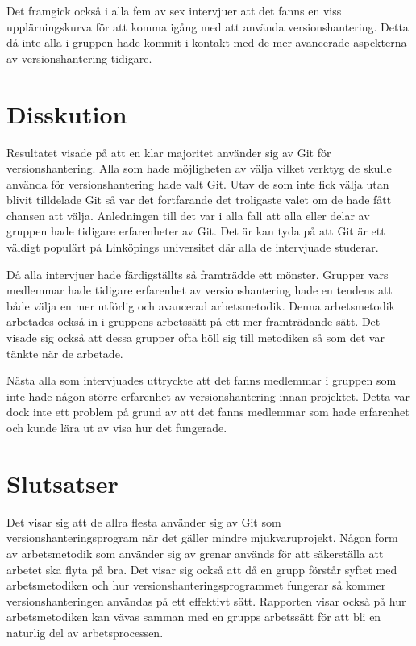 Det framgick också i alla fem av sex intervjuer att det fanns en viss upplärningskurva för att komma igång med att använda versionshantering. Detta då inte alla i gruppen hade kommit i kontakt med de mer avancerade aspekterna av versionshantering tidigare.

\section{Disskution}

Resultatet visade på att en klar majoritet använder sig av Git för versionshantering. Alla som hade möjligheten av välja vilket verktyg de skulle använda för versionshantering hade valt Git. Utav de som inte fick välja utan blivit tilldelade Git så var det fortfarande det troligaste valet om de hade fått chansen att välja. Anledningen till det var i alla fall att alla eller delar av gruppen hade tidigare erfarenheter av Git. Det är kan tyda på att Git är ett väldigt populärt på Linköpings universitet där alla de intervjuade studerar.

Då alla intervjuer hade färdigställts så framträdde ett mönster. Grupper vars medlemmar hade tidigare erfarenhet av versionshantering hade en tendens att både välja en mer utförlig och avancerad arbetsmetodik. Denna arbetsmetodik arbetades också in i gruppens arbetssätt på ett mer framträdande sätt. Det visade sig också att dessa grupper ofta höll sig till metodiken så som det var tänkte när de arbetade.

Nästa alla som intervjuades uttryckte att det fanns medlemmar i gruppen som inte hade någon större erfarenhet av versionshantering innan projektet. Detta var dock inte ett problem på grund av att det fanns medlemmar som hade erfarenhet och kunde lära ut av visa hur det fungerade.

\section{Slutsatser}

Det visar sig att de allra flesta använder sig av Git som versionshanteringsprogram när det gäller mindre mjukvaruprojekt. Någon form av arbetsmetodik som använder sig av grenar används för att säkerställa att arbetet ska flyta på bra. Det visar sig också att då en grupp förstår syftet med arbetsmetodiken och hur versionshanteringsprogrammet fungerar så kommer versionshanteringen användas på ett effektivt sätt. Rapporten visar också på hur arbetsmetodiken kan vävas samman med en grupps arbetssätt för att bli en naturlig del av arbetsprocessen.
